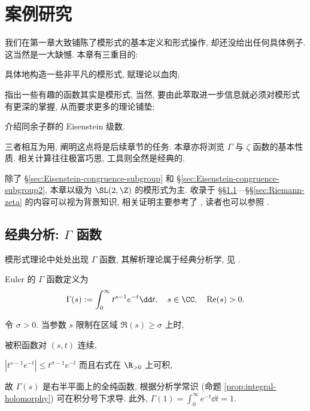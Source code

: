 
\chapter{案例研究}

我们在第一章大致铺陈了模形式的基本定义和形式操作, 却还没给出任何具体例子. 这当然是一大缺憾. 本章有三重目的:
\begin{compactitem}
	\item 具体地构造一些非平凡的模形式, 赋理论以血肉;
	\item 指出一些有趣的函数其实是模形式, 当然, 要由此萃取进一步信息就必须对模形式有更深的掌握, 从而要求更多的理论铺垫;
	\item 介绍同余子群的 Eisenstein 级数.
\end{compactitem}
三者相互为用, 阐明这点将是后续章节的任务. 本章亦将浏览 $\Gamma$ 与 $\zeta$ 函数的基本性质. 相关计算往往极富巧思, 工具则全然是经典的.

除了 \S\ref{sec:Eisenstein-congruence-subgroup} 和 \S\ref{sec:Eisenstein-congruence-subgroup2}, 本章以级为 $\SL(2,\Z)$ 的模形式为主. 收录于 \S\S\ref{sec:Gamma}---\S\S\ref{sec:Riemann-zeta} 的内容可以视为背景知识, 相关证明主要参考了 \cite{GW}, 读者也可以参照 \cite[第 6 章]{Ste17}.

\section{经典分析: \texorpdfstring{$\Gamma$}{Gamma} 函数}\label{sec:Gamma}
模形式理论中处处出现 $\Gamma$ 函数, 其解析理论属于经典分析学, 见 \cite{GW}.

\begin{definition}\label{def:Euler-Gamma-fcn} 
	Euler 的 $\Gamma$ 函数定义为
	\[ \Gamma(s) := \int_0^\infty t^{s-1} e^{-t} \dd t, \quad s \in \CC, \quad \Re(s) > 0. \]
\end{definition}
令 $\sigma > 0$. 当参数 $s$ 限制在区域 $\Re(s) \geq \sigma$ 上时,
\begin{compactitem}
	\item 被积函数对 $(s,t)$ 连续,
	\item $\left| t^{s-1} e^{-t} \right| \leq t^{\sigma - 1} e^{-t}$ 而且右式在 $\R_{>0}$ 上可积,
\end{compactitem}
故 $\Gamma(s)$ 是右半平面上的全纯函数, 根据分析学常识 (命题 \ref{prop:integral-holomorphy}) 可在积分号下求导. 此外, $\Gamma(1) = \int_0^\infty e^{-t} \dd t = 1$.

